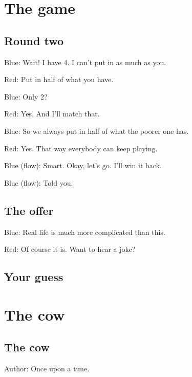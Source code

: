 \section[Rounds]{The game}\label{game}

\subsection{Round two}\label{round2}

Blue: Wait!
I have 4. I can't put in as much as you.

Red: Put in half of what you have.

Blue: Only 2?

Red: Yes. And I'll match that.


Blue: So we always put in half
of what the poorer one has.

Red: Yes. That way everybody can keep playing.


Blue (flow): Smart.
Okay, let's go.
I'll win it back.


Blue (flow): Told you.

\subsection{The offer}\label{offer}

Blue: Real life is
much more complicated than this.

Red: Of course it is.
Want to hear a joke?


\subsection{Your guess}\label{guess}

\section{The cow}\label{act:cow}

\subsection{The cow}\label{cow}

Author: Once upon a time.

\return
